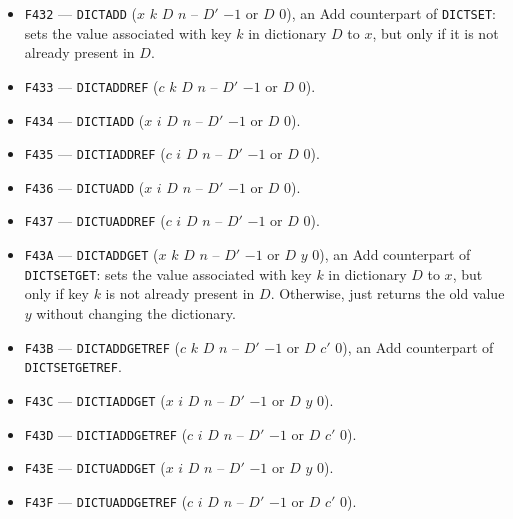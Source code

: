 \documentclass[12pt,oneside]{article}
\begin{document}
\begin{itemize}
\item {\tt F432} --- {\tt DICTADD} ($x$ $k$ $D$ $n$ -- $D'$ $-1$ or $D$ $0$), an {\sc Add} counterpart of {\tt DICTSET}: sets the value associated with key $k$ in dictionary $D$ to $x$, but only if it is not already present in $D$.
\item {\tt F433} --- {\tt DICTADDREF} ($c$ $k$ $D$ $n$ -- $D'$ $-1$ or $D$ $0$).
\item {\tt F434} --- {\tt DICTIADD} ($x$ $i$ $D$ $n$ -- $D'$ $-1$ or $D$ $0$).
\item {\tt F435} --- {\tt DICTIADDREF} ($c$ $i$ $D$ $n$ -- $D'$ $-1$ or $D$ $0$).
\item {\tt F436} --- {\tt DICTUADD} ($x$ $i$ $D$ $n$ -- $D'$ $-1$ or $D$ $0$).
\item {\tt F437} --- {\tt DICTUADDREF} ($c$ $i$ $D$ $n$ -- $D'$ $-1$ or $D$ $0$).
\item {\tt F43A} --- {\tt DICTADDGET} ($x$ $k$ $D$ $n$ -- $D'$ $-1$ or $D$ $y$ $0$), an {\sc Add} counterpart of {\tt DICTSETGET}: sets the value associated with key $k$ in dictionary $D$ to $x$, but only if key $k$ is not already present in $D$. Otherwise, just returns the old value $y$ without changing the dictionary.
\item {\tt F43B} --- {\tt DICTADDGETREF} ($c$ $k$ $D$ $n$ -- $D'$ $-1$ or $D$ $c'$ $0$), an {\sc Add} counterpart of {\tt DICTSETGETREF}.
\item {\tt F43C} --- {\tt DICTIADDGET} ($x$ $i$ $D$ $n$ -- $D'$ $-1$ or $D$ $y$ $0$).
\item {\tt F43D} --- {\tt DICTIADDGETREF} ($c$ $i$ $D$ $n$ -- $D'$ $-1$ or $D$ $c'$ $0$).
\item {\tt F43E} --- {\tt DICTUADDGET} ($x$ $i$ $D$ $n$ -- $D'$ $-1$ or $D$ $y$ $0$).
\item {\tt F43F} --- {\tt DICTUADDGETREF} ($c$ $i$ $D$ $n$ -- $D'$ $-1$ or $D$ $c'$ $0$).
\end{itemize}
\end{document}
